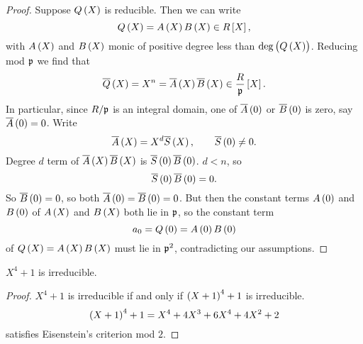 \begin{proof}
Suppose $ Q\br{X} $ is reducible. Then we can write
$$ Q\br{X} = A\br{X}B\br{X} \in R\sbr{X}, $$
with $ A\br{X} $ and $ B\br{X} $ monic of positive degree less than $ \deg\br{Q\br{X}} $. Reducing mod $ \mathfrak{p} $ we find that
$$ \overline{Q}\br{X} = X^n = \overline{A}\br{X}\overline{B}\br{X} \in \dfrac{R}{\pp}\sbr{X}. $$
In particular, since $ R / \mathfrak{p} $ is an integral domain, one of $ \overline{A}\br{0} $ or $ \overline{B}\br{0} $ is zero, say $ \overline{A}\br{0} = 0 $. Write
$$ \overline{A}\br{X} = X^d\overline{S}\br{X}, \qquad \overline{S}\br{0} \ne 0. $$
Degree $ d $ term of $ \overline{A}\br{X}\overline{B}\br{X} $ is $ \overline{S}\br{0}\overline{B}\br{0} $. $ d < n $, so
$$ \overline{S}\br{0}\overline{B}\br{0} = 0. $$
So $ \overline{B}\br{0} = 0 $, so both $ \overline{A}\br{0} = \overline{B}\br{0} = 0 $. But then the constant terms $ A\br{0} $ and $ B\br{0} $ of $ A\br{X} $ and $ B\br{X} $ both lie in $ \mathfrak{p} $, so the constant term
$$ a_0 = Q\br{0} = A\br{0}B\br{0} $$
of $ Q\br{X} = A\br{X}B\br{X} $ must lie in $ \mathfrak{p}^2 $, contradicting our assumptions.
\end{proof}

\begin{corollary}
$ X^4 + 1 $ is irreducible.
\end{corollary}

\begin{proof}
$ X^4 + 1 $ is irreducible if and only if $ \br{X + 1}^4 + 1 $ is irreducible.
$$ \br{X + 1}^4 + 1 = X^4 + 4X^3 + 6X^4 + 4X^2 + 2 $$
satisfies Eisenstein's criterion mod $ 2 $.
\end{proof}


